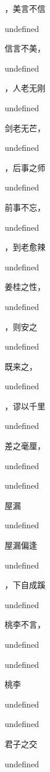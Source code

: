 \documentclass[12pt, a4paper, addpoints]{exam}
\begin{document}
\begin{multicols}{2}
\begin{questions}
\question[2] \fillin，美言不信

undefined

\question[2] 信言不美，\fillin

undefined

\question[2] \fillin，人老无刚

undefined

\question[2] 剑老无芒，\fillin

undefined

\question[2] \fillin，后事之师

undefined

\question[2] 前事不忘，\fillin

undefined

\question[2] \fillin，到老愈辣

undefined

\question[2] 姜桂之性，\fillin

undefined

\question[2] \fillin，则安之

undefined

\question[2] 既来之，\fillin

undefined

\question[2] \fillin，谬以千里

undefined

\question[2] 差之毫厘，\fillin

undefined

\question[2] 

undefined

\question[2] 屋漏

undefined

\question[2] 屋漏偏逢\fillin

undefined

\question[2] \fillin，下自成蹊

undefined

\question[2] 桃李不言，\fillin

undefined

\question[2] 

undefined

\question[2] 桃李\fillin

undefined

\question[2] 

undefined

\question[2] 君子之交\fillin

undefined

\question[2] 


\end{questions}
\end{multicols}
\end{document}
